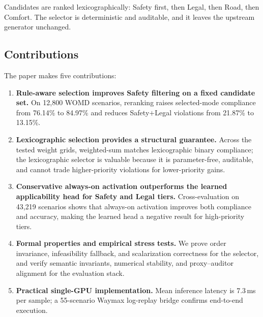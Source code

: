 Candidates are ranked lexicographically: Safety first, then Legal, then Road, then Comfort. The selector is deterministic and auditable, and it leaves the upstream generator unchanged.

\subsection{Contributions}
\label{subsec:contributions}

The paper makes five contributions:

\begin{enumerate}[label=\textbf{C\arabic*},leftmargin=2.5em]

\item \textbf{Rule-aware selection improves Safety filtering on a fixed candidate set.} On 12{,}800 WOMD scenarios, reranking raises selected-mode compliance from 76.14\% to 84.97\% and reduces Safety$+$Legal violations from 21.87\% to 13.15\%.

\item \textbf{Lexicographic selection provides a structural guarantee.} Across the tested weight grids, weighted-sum matches lexicographic binary compliance; the lexicographic selector is valuable because it is parameter-free, auditable, and cannot trade higher-priority violations for lower-priority gains.

\item \textbf{Conservative always-on activation outperforms the learned applicability head for Safety and Legal tiers.} Cross-evaluation on 43{,}219 scenarios shows that always-on activation improves both compliance and accuracy, making the learned head a negative result for high-priority tiers.

\item \textbf{Formal properties and empirical stress tests.} We prove order invariance, infeasibility fallback, and scalarization correctness for the selector, and verify semantic invariants, numerical stability, and proxy--auditor alignment for the evaluation stack.

\item \textbf{Practical single-GPU implementation.} Mean inference latency is 7.3\,ms per sample; a 55-scenario Waymax log-replay bridge confirms end-to-end execution.

\end{enumerate}

